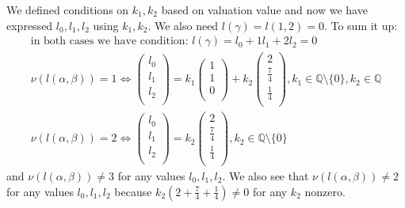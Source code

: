 \documentclass[12pt, a4paper]{article}
\begin{document}
We defined conditions on $k_1,k_2$ based on valuation value and now we have expressed $l_0,l_1,l_2$ using $k_1,k_2$. We also need $l(\gamma)=l(1,2)=0$. To sum it up:
\begin{gather*}
\text{in both cases we have condition: } l(\gamma)=l_0+1l_1+2l_2 = 0\\
\nu(l(\alpha,\beta)) = 1 \iff \begin{pmatrix}
l_0\\
l_1\\
l_2\\
\end{pmatrix} = k_1\begin{pmatrix}
1\\
1\\
0\\
\end{pmatrix} + k_2\begin{pmatrix}
2\\
\frac{7}{4}\\
\frac{1}{4}\\
\end{pmatrix}, k_1 \in \mathbb{Q}\setminus\{0\}, k_2 \in \mathbb{Q}\\
\nu(l(\alpha,\beta)) = 2 \iff \begin{pmatrix}
l_0\\
l_1\\
l_2\\
\end{pmatrix} = k_2\begin{pmatrix}
2\\
\frac{7}{4}\\
\frac{1}{4}\\
\end{pmatrix}, k_2 \in \mathbb{Q}\setminus\{0\}
\end{gather*}
and $\nu(l(\alpha,\beta)) \neq 3$ for any values $l_0,l_1,l_2$. We also see that $\nu(l(\alpha,\beta)) \neq 2$ for any values $l_0,l_1,l_2$ because $k_2(2+\frac{7}{4}+\frac{1}{4})\neq 0$ for any $k_2$ nonzero.
\end{document}
